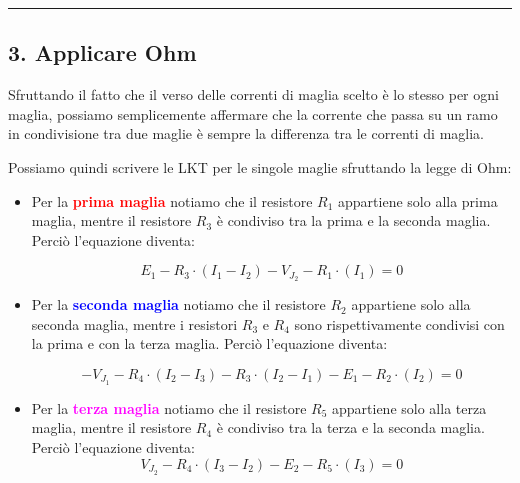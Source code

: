 \hrule
\subsection*{3. Applicare Ohm}


Sfruttando il fatto che il verso delle correnti di maglia scelto è lo stesso per ogni maglia, possiamo semplicemente affermare che la corrente che passa su un ramo in condivisione tra due maglie è sempre la differenza tra le correnti di maglia.

Possiamo quindi scrivere le LKT per le singole maglie sfruttando la legge di Ohm:

\begin{itemize}
    \item Per la \textcolor{red}{\textbf{prima maglia}} notiamo che il resistore $R_1$ appartiene solo alla prima maglia, mentre il resistore $R_3$ è condiviso tra la prima e la seconda maglia. Perciò l'equazione diventa:

          \begin{equation}
              E_1 - R_3\cdot \left(I_1 - I_2\right) - V_{J_2} - R_1\cdot \left(I_1\right) = 0
              \label{eq: prima_maglia_Ohm_corrente}
          \end{equation}

    \item Per la \textcolor{blue}{\textbf{seconda maglia}} notiamo che il resistore $R_2$ appartiene solo alla seconda maglia, mentre i resistori $R_3$ e $R_4$ sono rispettivamente condivisi con la prima e con la terza maglia. Perciò l'equazione diventa:

          \begin{equation}
              - V_{J_1} - R_4 \cdot \left(I_2 - I_3\right) - R_3 \cdot \left(I_2 - I_1\right) - E_1 - R_2 \cdot \left(I_2 \right) = 0
              \label{eq: seconda_maglia_Ohm_corrente}
          \end{equation}


    \item Per la \textcolor{magenta}{\textbf{terza maglia}} notiamo che il resistore $R_5$ appartiene solo alla terza maglia, mentre il resistore $R_4$ è condiviso tra la terza e la seconda maglia. Perciò l'equazione diventa:
          \begin{equation}
              V_{J_2} - R_4\cdot\left( I_3 - I_2 \right) - E_2 - R_5\cdot \left( I_3 \right) = 0
              \label{eq: terza_maglia_Ohm_corrente}
          \end{equation}
\end{itemize}


